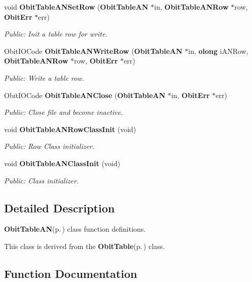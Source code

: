 \begin{CompactItemize}
void {\bf Obit\-Table\-ANSet\-Row} ({\bf Obit\-Table\-AN} $\ast$in, {\bf Obit\-Table\-ANRow} $\ast$row, {\bf Obit\-Err} $\ast$err)
\begin{CompactList}\small\item\em Public: Init a table row for write. \item\end{CompactList}\item 
Obit\-IOCode {\bf Obit\-Table\-ANWrite\-Row} ({\bf Obit\-Table\-AN} $\ast$in, {\bf olong} i\-ANRow, {\bf Obit\-Table\-ANRow} $\ast$row, {\bf Obit\-Err} $\ast$err)
\begin{CompactList}\small\item\em Public: Write a table row. \item\end{CompactList}\item 
Obit\-IOCode {\bf Obit\-Table\-ANClose} ({\bf Obit\-Table\-AN} $\ast$in, {\bf Obit\-Err} $\ast$err)
\begin{CompactList}\small\item\em Public: Close file and become inactive. \item\end{CompactList}\item 
void {\bf Obit\-Table\-ANRow\-Class\-Init} (void)
\begin{CompactList}\small\item\em Public: Row Class initializer. \item\end{CompactList}\item 
void {\bf Obit\-Table\-ANClass\-Init} (void)
\begin{CompactList}\small\item\em Public: Class initializer. \item\end{CompactList}\end{CompactItemize}


\subsection{Detailed Description}
{\bf Obit\-Table\-AN}{\rm (p.\,\pageref{structObitTableAN})} class function definitions. 

This class is derived from the {\bf Obit\-Table}{\rm (p.\,\pageref{structObitTable})} class.

\subsection{Function Documentation}
